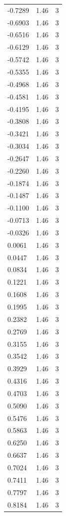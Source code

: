 \begin{longtable}{lrr}
  -0.7289 & 1.46 & 3 \\
  -0.6903 & 1.46 & 3 \\
  -0.6516 & 1.46 & 3 \\
  -0.6129 & 1.46 & 3 \\
  -0.5742 & 1.46 & 3 \\
  -0.5355 & 1.46 & 3 \\
  -0.4968 & 1.46 & 3 \\
  -0.4581 & 1.46 & 3 \\
  -0.4195 & 1.46 & 3 \\
  -0.3808 & 1.46 & 3 \\
  -0.3421 & 1.46 & 3 \\
  -0.3034 & 1.46 & 3 \\
  -0.2647 & 1.46 & 3 \\
  -0.2260 & 1.46 & 3 \\
  -0.1874 & 1.46 & 3 \\
  -0.1487 & 1.46 & 3 \\
  -0.1100 & 1.46 & 3 \\
  -0.0713 & 1.46 & 3 \\
  -0.0326 & 1.46 & 3 \\
  0.0061 & 1.46 & 3 \\
  0.0447 & 1.46 & 3 \\
  0.0834 & 1.46 & 3 \\
  0.1221 & 1.46 & 3 \\
  0.1608 & 1.46 & 3 \\
  0.1995 & 1.46 & 3 \\
  0.2382 & 1.46 & 3 \\
  0.2769 & 1.46 & 3 \\
  0.3155 & 1.46 & 3 \\
  0.3542 & 1.46 & 3 \\
  0.3929 & 1.46 & 3 \\
  0.4316 & 1.46 & 3 \\
  0.4703 & 1.46 & 3 \\
  0.5090 & 1.46 & 3 \\
  0.5476 & 1.46 & 3 \\
  0.5863 & 1.46 & 3 \\
  0.6250 & 1.46 & 3 \\
  0.6637 & 1.46 & 3 \\
  0.7024 & 1.46 & 3 \\
  0.7411 & 1.46 & 3 \\
  0.7797 & 1.46 & 3 \\
  0.8184 & 1.46 & 3 \\

\end{longtable}
